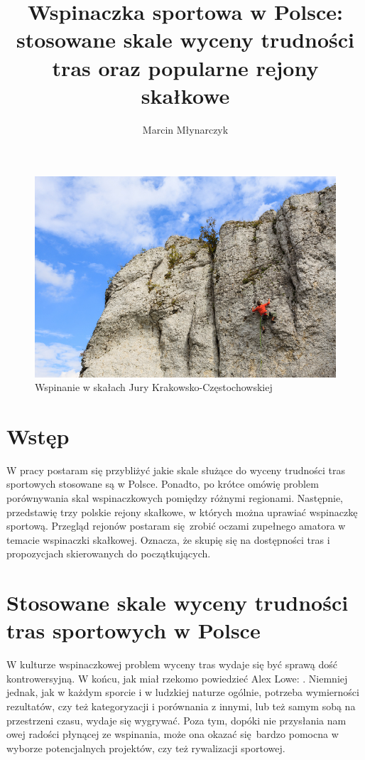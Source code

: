 \documentclass{article}
\title{Wspinaczka sportowa w Polsce: stosowane skale wyceny trudności tras oraz popularne rejony skałkowe}
\author{Marcin Młynarczyk}
\date{\displaydate{date}}
\begin{document}
\maketitle
\tableofcontents

\bigskip

\begin{figure}[!htbp]
	\begin{center}
		\includegraphics[width=0.9\linewidth]{images/wspin-jura.eps}
	\end{center}
	\caption{Wspinanie w skałach Jury Krakowsko-Częstochowskiej \cite{jura-intro}}
	\label{}
\end{figure}

\section{Wstęp}
\lettrine[lines=2]{W}{} pracy postaram się przybliżyć jakie skale służące do wyceny trudności tras sportowych stosowane są w Polsce. Ponadto, po krótce omówię problem porównywania skal wspinaczkowych pomiędzy różnymi regionami. Następnie, przedstawię trzy polskie rejony skałkowe, w których można uprawiać wspinaczkę sportową. Przegląd rejonów postaram się zrobić oczami zupełnego amatora w temacie wspinaczki skałkowej. Oznacza, że skupię się na dostępności tras i propozycjach skierowanych do początkujących.


\section{Stosowane skale wyceny trudności tras sportowych w Polsce}
\lettrine[lines=2]{W}{} kulturze wspinaczkowej problem wyceny tras wydaje się być sprawą dość kontrowersyjną. W końcu, jak miał rzekomo powiedzieć Alex Lowe:  \cite{alex-lowe}. Niemniej jednak, jak w każdym sporcie i w ludzkiej naturze ogólnie, potrzeba wymierności rezultatów, czy też kategoryzacji i porównania z innymi, lub też samym sobą na przestrzeni czasu, wydaje się wygrywać. Poza tym, dopóki  nie przysłania nam owej radości płynącej ze wspinania, może ona okazać się bardzo pomocna w wyborze potencjalnych projektów, czy też rywalizacji sportowej. 
\end{document}
